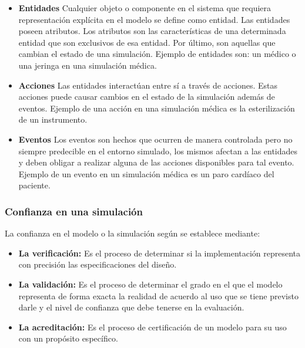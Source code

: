 \begin{itemize}

\item \textbf{Entidades} Cualquier objeto o componente en el sistema que
    requiera representación explícita en el modelo se define como
    entidad\cite{banks2000dm}. Las entidades poseen atributos. Los atributos son
    las características de una determinada entidad que son exclusivos de esa
    entidad. Por último, son aquellas que cambian el estado de una simulación.
    Ejemplo de entidades son: un médico o una jeringa en una simulación médica.

\item \textbf{Acciones} Las entidades interactúan entre sí a través de acciones.
    Estas acciones puede causar cambios en el estado de la simulación además de
    eventos. Ejemplo de una acción en una simulación médica es la esterilización
    de un instrumento.

\item \textbf{Eventos} Los eventos son hechos que ocurren de manera controlada
    pero no siempre predecible en el entorno simulado, los mismos afectan a las
    entidades y deben obligar a realizar alguna de las acciones disponibles para
    tal evento. Ejemplo de un evento en un simulación médica es un paro cardíaco
    del paciente.

\end{itemize}


\subsubsection{Confianza en una simulación}

La confianza en el modelo o la simulación según\cite{DoDSysEng2001} se establece
mediante:

\begin{itemize}

\item \textbf{La verificación:} Es el proceso de determinar si la implementación
    representa con precisión las especificaciones del diseño. 

\item \textbf{La validación:} Es el proceso de determinar el grado en el que el
    modelo representa de forma exacta la realidad de acuerdo al uso que se tiene
    previsto darle y el nivel de confianza que debe tenerse en la evaluación.

\item \textbf{La acreditación:} Es el proceso de certificación de un modelo para
    su uso con un propósito específico.

\end{itemize}


